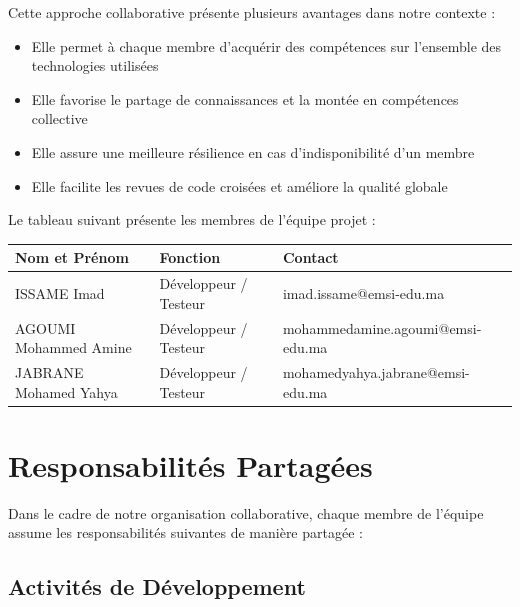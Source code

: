 \documentclass[12pt,a4paper]{report}
\begin{document}
Cette approche collaborative présente plusieurs avantages dans notre contexte :
\begin{itemize}
    \item Elle permet à chaque membre d'acquérir des compétences sur l'ensemble des technologies utilisées
    \item Elle favorise le partage de connaissances et la montée en compétences collective
    \item Elle assure une meilleure résilience en cas d'indisponibilité d'un membre
    \item Elle facilite les revues de code croisées et améliore la qualité globale
\end{itemize}

Le tableau suivant présente les membres de l'équipe projet :

\begin{center}
\begin{tabular}{|l|l|l|}
    \hline
    \textbf{Nom et Prénom} & \textbf{Fonction} & \textbf{Contact} \\
    \hline
    ISSAME Imad & Développeur / Testeur & imad.issame@emsi-edu.ma \\
    \hline
    AGOUMI Mohammed Amine & Développeur / Testeur & mohammedamine.agoumi@emsi-edu.ma \\
    \hline
    JABRANE Mohamed Yahya & Développeur / Testeur & mohamedyahya.jabrane@emsi-edu.ma \\
    \hline
\end{tabular}
\end{center}

\section{Responsabilités Partagées}

Dans le cadre de notre organisation collaborative, chaque membre de l'équipe assume les responsabilités suivantes de manière partagée :

\subsection{Activités de Développement}
\end{document}
